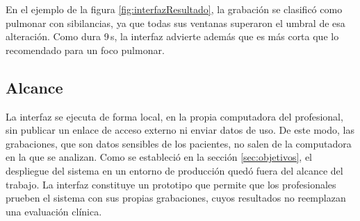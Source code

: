 En el ejemplo de la figura \ref{fig:interfazResultado}, la grabación se clasificó como pulmonar con
sibilancias, ya que todas sus ventanas superaron el umbral de esa alteración. Como dura 9\,s, la
interfaz advierte además que es más corta que lo recomendado para un foco pulmonar.

\subsection{Alcance}
\label{subsec:alcanceInterfaz}

La interfaz se ejecuta de forma local, en la propia computadora del profesional, sin publicar un
enlace de acceso externo ni enviar datos de uso. De este modo, las grabaciones, que son datos
sensibles de los pacientes, no salen de la computadora en la que se analizan. Como se estableció en
la sección \ref{sec:objetivos}, el despliegue del sistema en un entorno de producción quedó fuera
del alcance del trabajo. La interfaz constituye un prototipo que permite que los profesionales
prueben el sistema con sus propias grabaciones, cuyos resultados no reemplazan una evaluación
clínica.